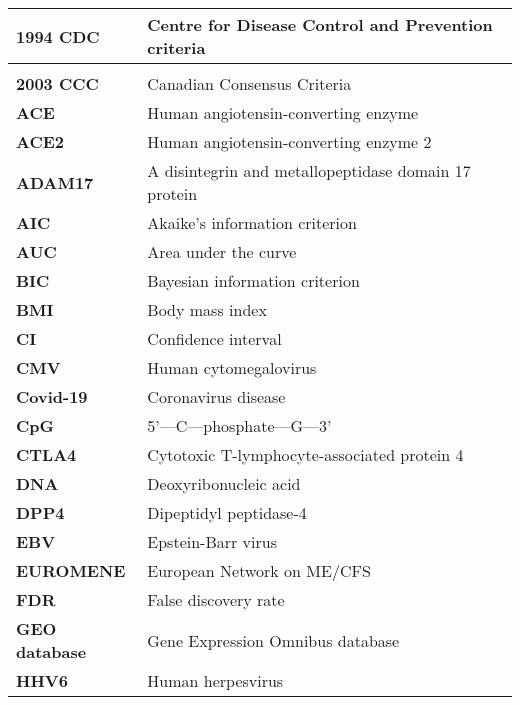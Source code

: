 \begin{longtable}[l]{>{\bfseries}l|l}
    1994 CDC     & Centre for Disease Control and Prevention criteria   \\
    \endfirsthead
    \multicolumn{2}{c}{{\small}} \\
    \endhead
    2003 CCC     & Canadian Consensus Criteria                          \\
    ACE          & Human angiotensin-converting enzyme                  \\
    ACE2         & Human angiotensin-converting enzyme 2                \\
    ADAM17       & A disintegrin and metallopeptidase domain 17 protein \\
    AIC          & Akaike's information criterion                       \\
    AUC          & Area under the curve                                 \\
    BIC          & Bayesian information criterion                       \\
    BMI          & Body mass index                                      \\
    CI           & Confidence interval                                  \\
    CMV          & Human cytomegalovirus                                \\
    Covid-19     & Coronavirus disease                                  \\
    CpG          & 5'---C---phosphate---G---3'                          \\
    CTLA4        & Cytotoxic T-lymphocyte-associated protein 4          \\
    DNA          & Deoxyribonucleic acid                                \\
    DPP4         & Dipeptidyl peptidase-4                               \\
    EBV          & Epstein-Barr virus                                   \\
    EUROMENE     & European Network on ME/CFS                           \\
    FDR          & False discovery rate                                 \\
    GEO database & Gene Expression Omnibus database                     \\
    HHV6         & Human herpesvirus                                    \\

\end{longtable}
